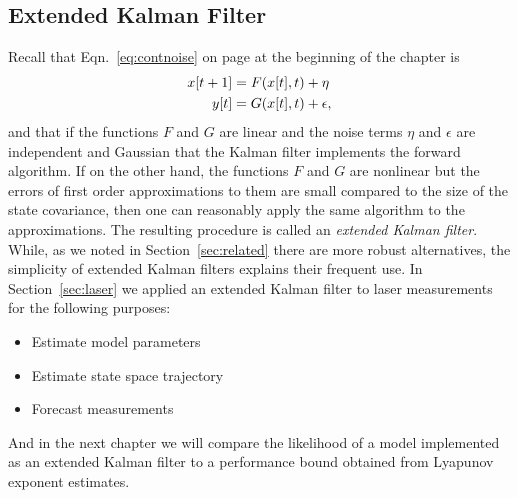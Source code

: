 \subsection{Extended Kalman Filter}
\label{sec:EKF}

Recall that Eqn.~\eqref{eq:contnoise} on page \pageref{eq:contnoise}
at the beginning of the chapter is
\begin{align*}
  {x}{[t+1]} &= F({x}{[t]},t) + \eta\\
  {y}{[t]}   &= G({x}{[t]},t) + \epsilon,
\end{align*}
and that if the functions $F$ and $G$ are linear and the noise terms
$\eta$ and $\epsilon$ are independent and Gaussian
that the Kalman filter implements the forward algorithm.  If on the
other hand, the functions $F$ and $G$ are nonlinear but the errors of
first order approximations to them are small compared to the size of
the state covariance, then one can reasonably apply the same algorithm to the
approximations.  The resulting procedure is called an \emph{extended
  Kalman filter}.  While, as we noted in Section~\ref{sec:related}
there are more robust alternatives, the simplicity of extended Kalman
filters explains their frequent use.  In Section~\ref{sec:laser} we
applied an extended Kalman filter to laser measurements for the
following purposes:
\begin{itemize}
\item Estimate model parameters
\item Estimate state space trajectory
\item Forecast measurements
\end{itemize}
And in the next chapter we will compare the likelihood of a model
implemented as an extended Kalman filter to a performance bound
obtained from Lyapunov exponent estimates.

